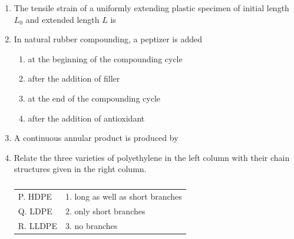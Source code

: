 \documentclass[a4paper,10pt]{article}
\begin{document}
\begin{enumerate}[label=\Alph*)]
    \item The tensile strain of a uniformly extending plastic specimen of initial length $L_0$ and extended length $L$ is
    
    \hfill{}
    \begin{enumerate}[label=\Alph*)]
    \end{enumerate}

    \item In natural rubber compounding, a peptizer is added
    
    \hfill{}
    \begin{enumerate}[label=\Alph*)]
        \item at the beginning of the compounding cycle
        \item after the addition of filler
        \item at the end of the compounding cycle
        \item after the addition of antioxidant
    \end{enumerate}

    \item A continuous annular product is produced by
    
    \hfill{}
    \begin{enumerate}[label=\Alph*)]
    \end{enumerate}

    \item Relate the three varieties of polyethylene in the left column with their chain structures given in the right column.
    \begin{table}[h!] \centering \caption*{} \label{tab:q7_polymer}
        \begin{tabular}{ll} \hline
            P. HDPE & 1. long as well as short branches \\
            Q. LDPE & 2. only short branches \\
            R. LLDPE & 3. no branches \\ \hline
        \end{tabular}
    \end{table}
    

\end{enumerate}
\end{document}
